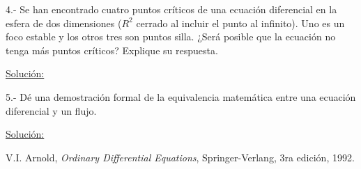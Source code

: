 \documentclass[a4paper,10pt]{article}
\begin{document}
\newpage

4.- Se han encontrado cuatro puntos críticos de una ecuación diferencial en la esfera
de dos dimensiones ($R^2$ cerrado al incluir el punto al infinito). Uno es un foco
estable y los otros tres son puntos silla. ¿Será posible que la ecuación no tenga
más puntos críticos? Explique su respuesta.


\vspace{.3cm}

\underline{Solución:}

\vspace{.3cm}

5.- Dé una demostración formal de la equivalencia matemática entre una ecuación
diferencial y un flujo.

\vspace{.3cm}

\underline{Solución:}

\vspace{.3cm}


\begin{thebibliography}{10}
 V.I. Arnold, \emph{Ordinary Differential Equations}, Springer-Verlang,
 3ra edición, 1992.
\end{thebibliography}
\end{document}
